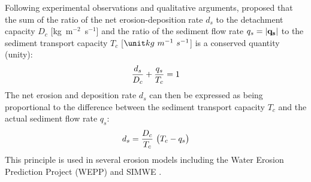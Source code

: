 \documentclass[gmd, manuscript]{copernicus}
\begin{document}
Following experimental observations and qualitative arguments, 
\citet{Foster1977} proposed that the sum of 
the ratio of the net erosion-deposition rate $d_s$ 
to the detachment capacity  $D_c$  [\unit{kg~m}$^{-2}$~\unit{s}$^{-1}$] 
and the ratio of the sediment flow rate $q_s = |{\bf q_s}|$ 
to the sediment transport capacity $T_c$ [$\unit kg~m^{-1}~s^{-1}$]
is a conserved quantity (unity):
\begin{equation}
\label{eq:foster_law}
{d_s \over D_c} + {q_s \over T_c} = 1
\end{equation}
The net erosion and deposition rate $d_s$ can then be expressed 
as being proportional to the difference between
the sediment transport capacity $T_c$ 
and the actual sediment flow rate $q_s$:
\begin{equation}
\label{eq:sigma}
d_s = {D_c \over T_c}~\bigl( T_c - q_s\bigr)
\end{equation}
\noindent
This principle is used in several erosion models 
including the Water Erosion Prediction Project (WEPP) \citep{Flanagan2013} 
and SIMWE \citep{Mitas1998}. 
\end{document}
